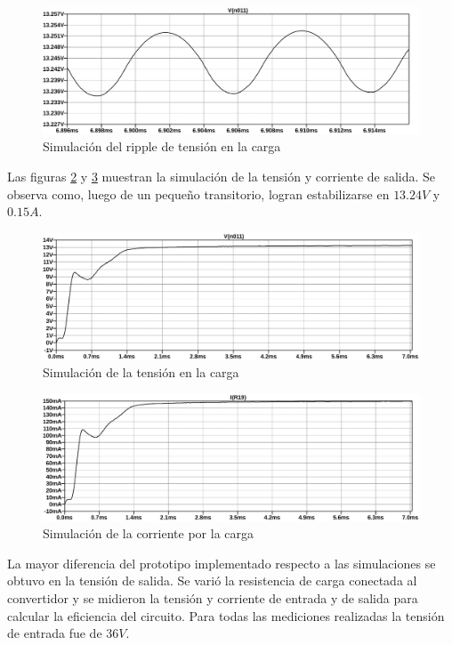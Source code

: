 \begin{figure}[H]
    \centering
    \includegraphics[width=\textwidth]{images/sim/21-ripple.pdf}
    \caption{Simulación del ripple de tensión en la carga}
    \label{fig:sim:21ripple}
\end{figure}

Las figuras \ref{fig:sim:21} y \ref{fig:sim:14} muestran la simulación de la tensión y corriente de salida. Se observa como, luego de un pequeño transitorio, logran estabilizarse en $13.24V$ y $0.15A$. 

\begin{figure}[H]
    \centering
    \includegraphics[width=\textwidth]{images/sim/21.pdf}
    \caption{Simulación de la tensión en la carga}
    \label{fig:sim:21}
\end{figure}

\begin{figure}[H]
    \centering
    \includegraphics[width=\textwidth]{images/sim/14.pdf}
    \caption{Simulación de la corriente por la carga}
    \label{fig:sim:14}
\end{figure}

La mayor diferencia del prototipo implementado respecto a las simulaciones se obtuvo en la tensión de salida. 
Se varió la resistencia de carga conectada al convertidor y se midieron la tensión y corriente de entrada y de salida para calcular la eficiencia del circuito.
Para todas las mediciones realizadas la tensión de entrada fue de $36V$.


